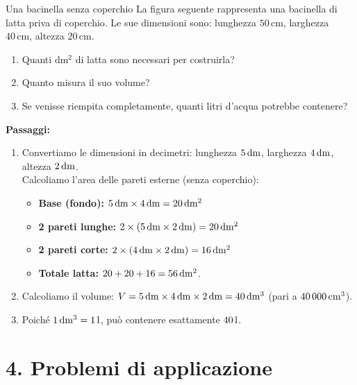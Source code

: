 \begin{esercizio}{Una bacinella senza coperchio}
La figura seguente rappresenta una bacinella di latta priva di coperchio. Le sue dimensioni sono: lunghezza $50\,\mathrm{cm}$, larghezza $40\,\mathrm{cm}$, altezza $20\,\mathrm{cm}$.


\begin{enumerate}[label=\alph*)]
  \item Quanti $\mathrm{dm^2}$ di latta sono necessari per costruirla?
  \item Quanto misura il suo volume?
  \item Se venisse riempita completamente, quanti litri d'acqua potrebbe contenere?
\end{enumerate}

\responsespace{4.2cm}

\begin{soluzione}
  \textbf{Passaggi:}
  \begin{enumerate}[label=\alph*)]
    \item Convertiamo le dimensioni in decimetri: lunghezza $5\,\mathrm{dm}$, larghezza $4\,\mathrm{dm}$, altezza $2\,\mathrm{dm}$.\\
    Calcoliamo l'area delle pareti esterne (senza coperchio):
    \begin{itemize}
      \item \textbf{Base (fondo):} $5\,\mathrm{dm} \times 4\,\mathrm{dm} = 20\,\mathrm{dm^2}$
      \item \textbf{2 pareti lunghe:} $2 \times (5\,\mathrm{dm} \times 2\,\mathrm{dm}) = 20\,\mathrm{dm^2}$
      \item \textbf{2 pareti corte:} $2 \times (4\,\mathrm{dm} \times 2\,\mathrm{dm}) = 16\,\mathrm{dm^2}$
      \item \textbf{Totale latta:} $20 + 20 + 16 = 56\,\mathrm{dm^2}$.
    \end{itemize}
    \item Calcoliamo il volume: $V = 5\,\mathrm{dm} \times 4\,\mathrm{dm} \times 2\,\mathrm{dm} = 40\,\mathrm{dm^3}$ (pari a $40\,000\,\mathrm{cm^3}$).
    \item Poiché $1\,\mathrm{dm^3} = 1\,\mathrm{l}$, può contenere esattamente $40\,\mathrm{l}$.
  \end{enumerate}
\end{soluzione}
\end{esercizio}

\condnewpage

\section*{4. Problemi di applicazione}

